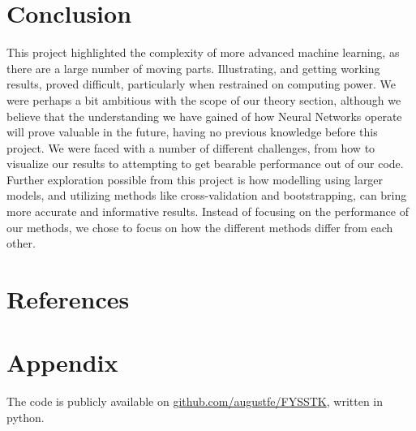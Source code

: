 \documentclass{article}
\theoremstyle{definition}
\begin{document}
\section{Conclusion}
This project highlighted the complexity of more advanced machine learning, as there are a large number of moving parts. Illustrating, and getting working results, proved difficult, particularly when restrained on computing power. We were perhaps a bit ambitious with the scope of our theory section, although we believe that the understanding we have gained of how Neural Networks operate will prove valuable in the future, having no previous knowledge before this project. We were faced with a number of different challenges, from how to visualize our results to attempting to get bearable performance out of our code. Further exploration possible from this project is how modelling using larger models, and utilizing methods like cross-validation and bootstrapping, can bring more accurate and informative results. Instead of focusing on the performance of our methods, we chose to focus on how the different methods differ from each other.

\newpage
\section{References}

\printbibliography

\section{Appendix}
The code is publicly available on \href{https://github.com/augustfe/FYSSTK}{github.com/augustfe/FYSSTK}, written in python.
\end{document}
